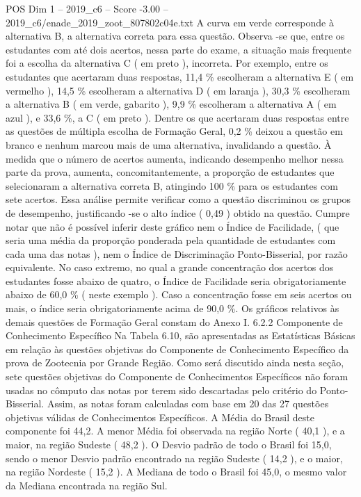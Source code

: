\begin{textsample}{POS Dim 1 – 2019\_c6 – Score -3.00 – 2019\_c6/enade\_2019\_zoot\_807802c04e.txt}
A curva em verde corresponde à alternativa B, a alternativa correta para essa questão.
Observa -se que, entre os estudantes com até dois acertos, nessa parte do exame, a situação mais frequente foi a escolha da alternativa C ( em preto ), incorreta.
Por exemplo, entre os estudantes que acertaram duas respostas, 11,4 \% escolheram a alternativa E ( em vermelho ), 14,5 \% escolheram a alternativa D ( em laranja ), 30,3 \% escolheram a alternativa B ( em verde, gabarito ), 9,9 \% escolheram a alternativa A ( em azul ), e 33,6 \%, a C ( em preto ).
Dentre os que acertaram duas respostas entre as questões de múltipla escolha de Formação Geral, 0,2 \% deixou a questão em branco e nenhum marcou mais de uma alternativa, invalidando a questão.
À medida que o número de acertos aumenta, indicando desempenho melhor nessa parte da prova, aumenta, concomitantemente, a proporção de estudantes que selecionaram a alternativa correta B, atingindo 100 \% para os estudantes com sete acertos.
Essa análise permite verificar como a questão discriminou os grupos de desempenho, justificando -se o alto índice ( 0,49 ) obtido na questão.
Cumpre notar que não é possível inferir deste gráfico nem o Índice de Facilidade, ( que seria uma média da proporção ponderada pela quantidade de estudantes com cada uma das notas ), nem o Índice de Discriminação Ponto-Bisserial, por razão equivalente.
No caso extremo, no qual a grande concentração dos acertos dos estudantes fosse abaixo de quatro, o Índice de Facilidade seria obrigatoriamente abaixo de 60,0 \% ( neste exemplo ).
Caso a concentração fosse em seis acertos ou mais, o índice seria obrigatoriamente acima de 90,0 \%.
Os gráficos relativos às demais questões de Formação Geral constam do Anexo I. 6.2.2 Componente de Conhecimento Específico Na Tabela 6.10, são apresentadas as Estatísticas Básicas em relação às questões objetivas do Componente de Conhecimento Específico da prova de Zootecnia por Grande Região.
Como será discutido ainda nesta seção, sete questões objetivas do Componente de Conhecimentos Específicos não foram usadas no cômputo das notas por terem sido descartadas pelo critério do Ponto-Bisserial.
Assim, as notas foram calculadas com base em 20 das 27 questões objetivas válidas de Conhecimentos Específicos.
A Média do Brasil deste componente foi 44,2.
A menor Média foi observada na região Norte ( 40,1 ), e a maior, na região Sudeste ( 48,2 ).
O Desvio padrão de todo o Brasil foi 15,0, sendo o menor Desvio padrão encontrado na região Sudeste ( 14,2 ), e o maior, na região Nordeste ( 15,2 ).
A Mediana de todo o Brasil foi 45,0, o mesmo valor da Mediana encontrada na região Sul.

\end{textsample}
